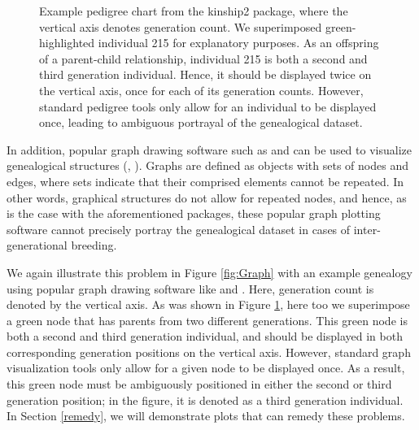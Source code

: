 \documentclass[article,shortnames]{jss}
\begin{document}
\begin{figure}[H]
    \centering
    \caption{Example pedigree chart from the kinship2 package, where the vertical axis denotes generation count. We superimposed green-highlighted individual 215 for explanatory purposes. As an offspring of a parent-child relationship, individual 215 is both a second and third generation individual. Hence, it should be displayed twice on the vertical axis, once for each of its generation counts. However, standard pedigree tools only allow for an individual to be displayed once, leading to ambiguous portrayal of the genealogical dataset.}
    \label{fig:kinshipFig}
\end{figure}

In addition, popular graph drawing software such as  and  can be used to visualize genealogical structures (\citealt{graphvizCit}, \citealt{cytoscapeCit}). Graphs are defined as objects with sets of nodes and edges, where sets indicate that their comprised elements cannot be repeated. In other words, graphical structures do not allow for repeated nodes, and hence, as is the case with the aforementioned  packages, these popular graph plotting software cannot precisely portray the genealogical dataset in cases of inter-generational breeding.

We again illustrate this problem in Figure \ref{fig:Graph} with an example genealogy using popular graph drawing software like  and . Here, generation count is denoted by the vertical axis. As was shown in Figure \ref{fig:kinshipFig}, here too we superimpose a green node that has parents from two different generations. This green node is both a second and third generation individual, and should be displayed in both corresponding generation positions on the vertical axis. However, standard graph visualization tools only allow for a given node to be displayed once. As a result, this green node must be ambiguously positioned in either the second or third generation position; in the figure, it is denoted as a third generation individual. In Section \ref{remedy}, we will demonstrate  plots that can remedy these problems.
\end{document}
